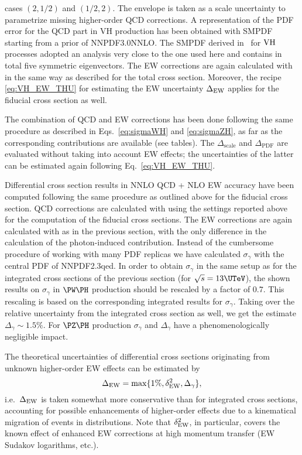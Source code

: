cases $(2,1/2)$ and $(1/2,2)$. The envelope is taken as a scale uncertainty to parametrize
missing higher-order QCD corrections.
A representation of the PDF error for the QCD part in VH production has been obtained
with SMPDF~\cite{Carrazza:2016htc} starting from a prior of NNPDF3.0NNLO. The SMPDF derived
in~\cite{Carrazza:2016htc} for $\rm{VH}$ processes adopted an analysis very close to the one used
here and contains in total five symmetric eigenvectors.
The EW corrections are again calculated with \HAWK{} in the same way as described for the 
total cross section. Moreover, the recipe \eqref{eq:VH_EW_THU} for estimating the
EW uncertainty $\Delta_{\mathrm{EW}}$ applies for the fiducial cross section as well.

The combination of QCD and EW corrections
has been done following the same procedure as described 
in Eqs.~\eqref{eq:sigmaWH} and \eqref{eq:sigmaZH}, as far as the
corresponding contributions are available (see tables).
The $\Delta_{\mathrm{scale}}$ and $\Delta_{\mathrm{PDF}}$ are
evaluated without taking into account EW effects;
the uncertainties of the latter can be estimated again following Eq.~\eqref{eq:VH_EW_THU}.

Differential cross section results in NNLO QCD + NLO EW accuracy have been computed
following the same procedure as outlined above for the fiducial cross section.
QCD corrections are calculated with \vhnnlo{} using
the settings reported above for the computation of the fiducial cross sections.
The EW corrections are again calculated with \HAWK{} as in the previous section, 
with the only difference in the calculation of the photon-induced contribution.
Instead of the cumbersome procedure of working with many PDF replicas we 
have calculated $\sigma_\gamma$ with the central PDF of NNPDF2.3qed.
In order to obtain $\sigma_\gamma$ in the same setup as for the integrated 
cross sections of the previous section (for $\sqrt{s}=13\UTeV$),
the shown results on $\sigma_\gamma$ in $\PW\PH$ production should be rescaled
by a factor of $0.7$. This rescaling is based on the corresponding 
integrated results for $\sigma_\gamma$. Taking over the relative uncertainty 
from the integrated cross section as well, we get the estimate
$\Delta_\gamma\sim1.5\%$.
For $\PZ\PH$ production $\sigma_\gamma$ and $\Delta_\gamma$ have a 
phenomenologically negligible impact.

The theoretical uncertainties of differential cross sections originating from unknown
higher-order EW effects can be estimated by
\begin{equation}
\Delta_{\mathrm{EW}} = \max\{1\%,\delta_{\mathrm{EW}}^2,\Delta_\gamma\},
\end{equation}
i.e.\ $\Delta_{\mathrm{EW}}$ is taken somewhat more conservative than for integrated cross sections,
accounting for possible enhancements of higher-order effects due to a kinematical migration
of events in distributions.
Note that $\delta_{\mathrm{EW}}^2$, in particular, covers the known effect of enhanced EW corrections at high
momentum transfer (EW Sudakov logarithms, etc.).

